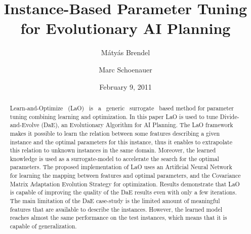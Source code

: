 \documentclass[runningheads,a4paper]{llncs}
\begin{document}
\title{Instance-Based Parameter Tuning\\
for Evolutionary AI Planning}

\author{ M{\'a}ty{\'a}s Brendel  \and Marc Schoenauer }





\date{February 9, 2011}
\maketitle
\begin{abstract}
Learn-and-Optimize ~(LaO) ~is ~a ~generic ~surrogate ~based method for parameter tuning combining learning and optimization. In this paper LaO is used to tune Divide-and-Evolve (DaE), an Evolutionary Algorithm for AI Planning. The LaO framework makes it possible to learn the relation between some features describing a given instance and the optimal parameters for this instance, thus it enables to extrapolate this relation to unknown instances in the same domain. Moreover, the learned knowledge is used as a surrogate-model to accelerate the search for the optimal parameters. The proposed implementation of LaO uses an Artificial Neural Network for learning the mapping between features and optimal parameters, and the Covariance Matrix Adaptation Evolution Strategy for optimization. Results demonstrate that LaO is capable of improving the quality of the DaE results even with only a few iterations. The main limitation of the DaE case-study is the limited amount of meaningful features that are available to describe the instances. However, the learned model reaches almost the same performance on the test instances, which means that it is capable of generalization. 

\end{abstract}
\end{document}
